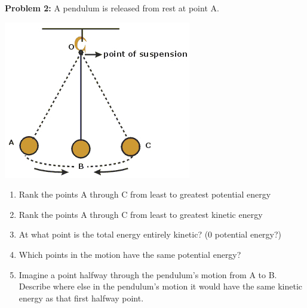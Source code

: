 \documentclass{article}
\begin{document}
\vspace{2cm}
\textbf{Problem 2:} A pendulum is released from rest at point A.

\begin{center}
\includegraphics[scale=0.8]{pendulum}
\end{center}

\begin{enumerate}
\item Rank the points A through C from least to greatest potential energy
\item Rank the points A through C from least to greatest kinetic energy
\item At what point is the total energy entirely kinetic? (0 potential energy?)
\item Which points in the motion have the same potential energy?
\item Imagine a point halfway through the pendulum's motion from A to B. Describe where else in the pendulum's motion it would have the same kinetic energy as that first halfway point.
\end{enumerate}
\end{document}
